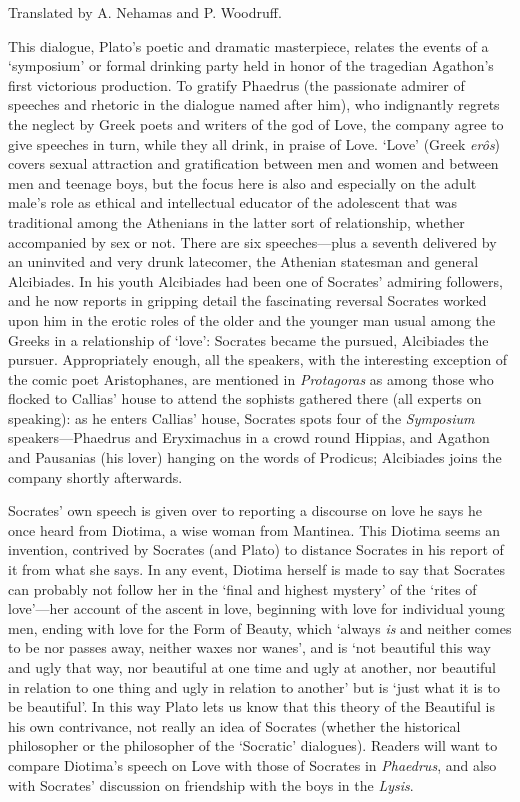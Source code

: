 \startchapter[title=Foreword to Symposium]

Translated by A. Nehamas and P. Woodruff.

This dialogue, Plato's poetic and dramatic masterpiece, relates the
events of a ‘symposium' or formal drinking party held in honor of
the tragedian Agathon's first victorious production. To gratify
Phaedrus (the passionate admirer of speeches and rhetoric in the
dialogue named after him), who indignantly regrets the neglect by
Greek poets and writers of the god of Love, the company agree to
give speeches in turn, while they all drink, in praise of Love. ‘Love'
(Greek {\em erôs}) covers sexual attraction and gratification
between men and women and between men and teenage boys, but the
focus here is also and especially on the adult male's role as
ethical and intellectual educator of the adolescent that was
traditional among the Athenians in the latter sort of relationship,
whether accompanied by sex or not. There are six speeches---plus a
seventh delivered by an uninvited and very drunk latecomer, the
Athenian statesman and general Alcibiades. In his youth Alcibiades
had been one of Socrates' admiring followers, and he now reports
in gripping detail the fascinating reversal Socrates worked upon
him in the erotic roles of the older and the younger man usual
among the Greeks in a relationship of ‘love': Socrates became the
pursued, Alcibiades the pursuer. Appropriately enough, all the
speakers, with the interesting exception of the comic poet
Aristophanes, are mentioned in {\em Protagoras} as among those who
flocked to Callias' house to attend the sophists gathered there
(all experts on speaking): as he enters Callias' house, Socrates spots 
four of the {\em Symposium} speakers---Phaedrus and Eryximachus in
a crowd round Hippias, and Agathon and Pausanias (his lover)
hanging on the words of Prodicus; Alcibiades joins the company
shortly afterwards.

Socrates' own speech is given over to reporting a discourse on love
he says he once heard from Diotima, a wise woman from Mantinea.
This Diotima seems an invention, contrived by Socrates (and Plato)
to distance Socrates in his report of it from what she says. In
any event, Diotima herself is made to say that Socrates can
probably not follow her in the ‘final and highest mystery' of the
‘rites of love'---her account of the ascent in love, beginning with love
for individual young men, ending with love for the Form of Beauty,
which ‘always {\em is} and neither comes to be nor passes away, neither
waxes nor wanes', and is ‘not beautiful this way and ugly that
way, nor beautiful at one time and ugly at another, nor beautiful
in relation to one thing and ugly in relation to another' but is
‘just what it is to be beautiful'. In this way Plato lets us know
that this theory of the Beautiful is his own contrivance, not
really an idea of Socrates (whether the historical philosopher or
the philosopher of the ‘Socratic' dialogues). Readers will want to
compare Diotima's speech on Love with those of Socrates in
{\em Phaedrus}, and also with Socrates' discussion on friendship with 
the boys in the {\em Lysis}.


